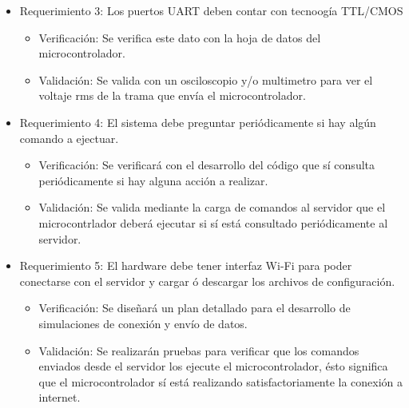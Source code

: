 \documentclass[
11pt, %
]{charter}
\begin{document}
\begin{itemize} 
\item Requerimiento 3: Los puertos UART deben contar con tecnoogía TTL/CMOS

\begin{itemize}
	\item Verificación: Se verifica este dato con la hoja de datos del microcontrolador. 
	\item Validación: Se valida con un osciloscopio y/o multimetro para ver el voltaje rms de la trama que envía el microcontrolador.
	  
\end{itemize}

\end{itemize}

\begin{itemize} 
\item Requerimiento 4: El sistema debe preguntar periódicamente si hay algún comando a ejectuar.

\begin{itemize}
	\item Verificación: Se verificará con el desarrollo del código que sí consulta periódicamente si hay alguna acción a realizar.
	\item Validación: Se valida mediante la carga de comandos al servidor que el microcontrlador deberá ejecutar si sí está consultado periódicamente al servidor.
\end{itemize}

\end{itemize}

\begin{itemize} 
\item Requerimiento 5: El hardware debe tener interfaz Wi-Fi para poder conectarse con el servidor y cargar ó descargar los archivos de configuración.

\begin{itemize}
	\item Verificación: Se diseñará un plan detallado para el desarrollo de simulaciones de conexión y envío de datos.
	\item Validación: Se realizarán pruebas para verificar que los comandos enviados desde el servidor los ejecute el microcontrolador, ésto significa que el microcontrolador sí está realizando satisfactoriamente la conexión a internet.
\end{itemize}

\end{itemize}
\end{document}
